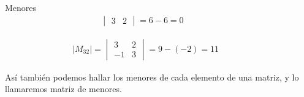 \begin{Example*} {Menores}
\begin{align*}
\begin{vmatrix}
			3&2
		\end{vmatrix}=6-6=0 \quad\quad\quad\quad
	\end{align*}
	\begin{align*}
		&|M_{32}|=\begin{vmatrix}
			3&2\\
			-1&3
		\end{vmatrix}=9-(-2)=11 \quad\quad\quad\quad
	\end{align*}
\end{Example*}
Así también podemos hallar los menores de cada elemento de una matriz, y lo llamaremos matriz de menores.
